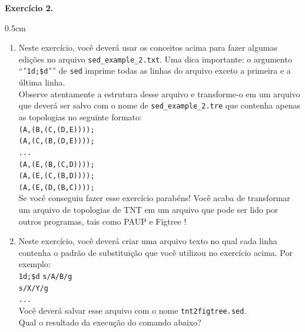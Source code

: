 \begin{refsection}
\begin{blackBlock}{\textbf{Exercício 2.}}\label{tut2:ex:2.\arabic{ex}}

\begin {myindentpar}{0.5cm}
\begin{enumerate}[\itshape i.]
 \item{Neste exercício, você deverá usar os conceitos acima para fazer algumas edições no arquivo \texttt{sed\_example\_2.txt}. Uma dica importante: o argumento ``\texttt{'1d;\$d'}'' de \texttt{sed} imprime todas as linhas do arquivo exceto a primeira e a última linha. }\label{tut2:sed:address:ex1}\\

Observe atentamente a estrutura desse arquivo e transforme-o em um arquivo que deverá ser salvo com o nome de  \texttt{sed\_example\_2.tre} que contenha apenas as topologias no seguinte formato:\\
\texttt{(A,(B,(C,(D,E))));}\\
\texttt{(A,(C,(B,(D,E))));}\\
\texttt{...}\\
\texttt{(A,(E,(B,(C,D))));}\\
\texttt{(A,(E,(C,(B,D))));}\\
\texttt{(A,(E,(D,(B,C))));}\\

Se você conseguiu fazer esse exercício parabéns! Você acaba de transformar um arquivo de topologias de TNT em um arquivo que pode ser lido por outros programas, tais como PAUP \parencite{Swofford_2003} e Figtree \parencite{Rambaut_2006}!\\

 \item{Neste exercício, você deverá criar uma arquivo texto no qual cada linha contenha o padrão de substituição que você utilizou no exercício acima. Por exemplo:}\\
\texttt{1d;\$d}
\texttt{s/A/B/g}\\
\texttt{s/X/Y/g}\\
\texttt{...}\\

Você deverá salvar esse arquivo com o nome \texttt{tnt2figtree.sed}.\\

Qual o resultado da execução do comando abaixo?\\

\\


\end{enumerate}
\end{myindentpar}
\end{blackBlock}
\end{refsection}
